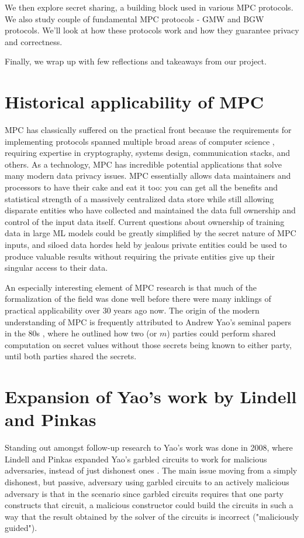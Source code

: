 \documentclass[11pt]{article}
\begin{document}
We then explore secret sharing, a building block used in various MPC protocols. We also study couple of fundamental MPC protocols - GMW and BGW protocols. We'll look at how these protocols work and how they guarantee privacy and correctness.

Finally, we wrap up with few reflections and takeaways from our project.

\section*{Historical applicability of MPC}

MPC has classically suffered on the practical front because the requirements for implementing protocols spanned 
multiple broad areas of computer science \cite{4}, requiring expertise in cryptography, systems design, communication stacks, and others. 
As a technology, MPC has incredible potential applications that solve many modern data privacy 
issues. MPC essentially allows data maintainers and processors to have their cake and eat it too: you can get all the benefits and statistical strength of a 
massively centralized data store while still allowing disparate entities who have collected and maintained the data full ownership and control of the input data itself. 
Current questions about ownership of training data in large ML models could be greatly simplified by the secret nature of MPC inputs, 
and siloed data hordes held by jealous private entities could be used to produce valuable results without requiring the private entities give up their singular access to their data. 

An especially interesting element of MPC research is that much of the formalization of the field was done well before there were 
many inklings of practical applicability over 30 years ago now. The origin of the modern understanding of MPC is frequently attributed to 
Andrew Yao's seminal papers in the 80s \cite{1, 5}, where he outlined how two (or $m$) parties could perform shared computation on secret values without those
secrets being known to either party, until both parties shared the secrets. 

\section*{Expansion of Yao's work by Lindell and Pinkas}

Standing out amongst follow-up research to Yao's work was done in 2008, where Lindell and Pinkas expanded Yao's garbled circuits to work for malicious adversaries, instead of just dishonest ones \cite{3}.
The main issue moving from a simply dishonest, but passive, adversary using garbled circuits to an actively malicious adversary is that in the scenario
since garbled circuits requires that one party constructs that circuit, a malicious constructor could build the circuits in such 
a way that the result obtained by the solver of the circuits is incorrect ("maliciously guided"). 
\end{document}

